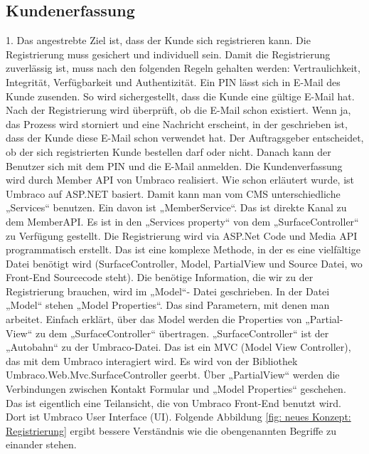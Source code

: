 \subsection{Kundenerfassung}
1. Das angestrebte Ziel ist, dass der Kunde sich registrieren kann. Die Registrierung muss gesichert und individuell sein. Damit die Registrierung zuverlässig ist, muss nach den folgenden Regeln gehalten werden: Vertraulichkeit, Integrität, Verfügbarkeit und Authentizität.
Ein \ac{PIN} lässt sich in E-Mail des Kunde zusenden. So wird sichergestellt, dass die Kunde eine gültige E-Mail hat. Nach der Registrierung wird überprüft, ob die E-Mail schon existiert. Wenn ja, das Prozess wird storniert und eine Nachricht erscheint, in der geschrieben ist, dass der Kunde diese E-Mail schon verwendet hat. 
Der Auftragsgeber entscheidet, ob der sich registrierten Kunde bestellen darf    oder nicht. Danach kann der Benutzer sich mit dem PIN und die E-Mail anmelden. 
Die Kundenverfassung wird durch Member \ac{API} von Umbraco realisiert. 
Wie schon erläutert wurde, ist Umbraco auf ASP.NET basiert. Damit kann man vom CMS unterschiedliche „Services“ benutzen. Ein davon ist „MemberService“. Das ist direkte Kanal zu dem MemberAPI. Es ist in den „Services property“ von dem „SurfaceController“ zu Verfügung gestellt. 
Die Registrierung wird via ASP.Net Code und Media API programmatisch erstellt. Das ist eine komplexe Methode, in der es eine vielfältige Datei benötigt wird (SurfaceController, Model, PartialView und Source Datei, wo Front-End Sourcecode steht). Die benötige Information, die wir zu der Registrierung brauchen, wird im „Model“- Datei geschrieben. 
In der Datei „Model“ stehen „Model Properties“. Das sind Parametern, mit denen man arbeitet. Einfach erklärt, über das Model werden die Properties von „Partial-View“ zu dem „SurfaceController“ übertragen.
„SurfaceController“ ist der „Autobahn“ zu der Umbraco-Datei. Das ist ein MVC (Model View Controller), das mit dem Umbraco interagiert wird. Es wird von der Bibliothek Umbraco.Web.Mvc.SurfaceController geerbt. 
Über „PartialView“ werden die Verbindungen zwischen Kontakt Formular und „Model Properties“ geschehen. Das ist eigentlich eine Teilansicht, die von Umbraco Front-End benutzt wird. Dort ist Umbraco User Interface (UI). 
Folgende Abbildung \ref{fig: neues Konzept: Registrierung} ergibt bessere Verständnis wie die obengenannten Begriffe zu einander stehen.

